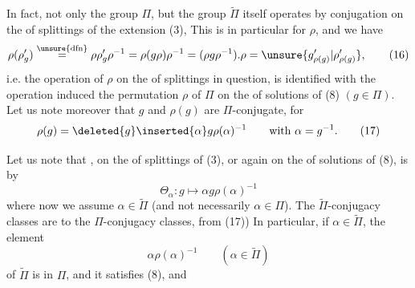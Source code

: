 In fact, not only the group $\Pi$, but the group $\widetilde\Pi$ itself operates by conjugation on the  of splittings of the extension (3), This is in particular  for $\rho$, and we have
\[
\rho(\rho'_g)\overset{\unsure{\mathrm{dfn}}}{=}
\rho\rho'_g\rho^{-1}=\rho(g\rho)\rho^{-1}
=(\rho g\rho^{-1}).\rho=\unsure{g'_{\rho(g)}|\rho'_{\rho(g)}}, \tag{16}
\]
i.e. the operation of $\rho$ on the  of splittings in question, is identified with the operation  induced  the permutation $\rho$ of $\Pi$ on the  of solutions of (8) $(g\in\Pi)$. Let us note moreover that $g$ and $\rho(g)$  are $\Pi$-conjugate, for
\[
\rho(g)=\deleted{g}\inserted{\alpha}g\rho(\alpha)^{-1}\qquad\text{with }\alpha=g^{-1}. \tag{17}
\]

Let us note that \deleted{\unsure{$\rho$}}, on the  of splittings of (3), or again on the  of solutions of (8), is   by
\[
\Theta_\alpha:g\longmapsto\alpha g\rho(\alpha)^{-1} \tag{10}
\]
where now we assume $\alpha\in\widetilde\Pi$ (and not necessarily $\alpha\in\Pi$). The $\widetilde\Pi$-conjugacy classes are  to the $\Pi$-conjugacy classes,   from (17))  In particular, if $\alpha\in\widetilde\Pi$, the element
\[
\alpha\rho(\alpha)^{-1}\qquad(\alpha\in\widetilde\Pi) \tag{18}
\]
of $\widetilde\Pi$ is in $\Pi$, and it  satisfies (8), and